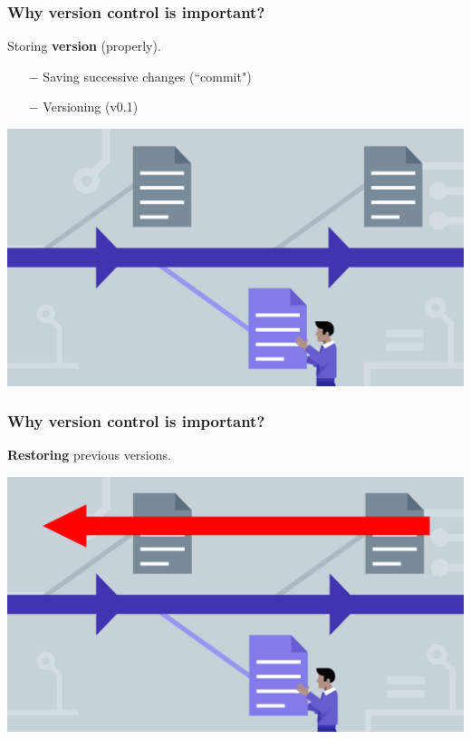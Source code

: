 \documentclass[svgnames]{beamer}
\begin{document}
\begin{frame}
\frametitle{Why version control is important?}

Storing \textbf{version} (properly). 
  \begin{itemize}
    \item [$-$] Saving successive changes (``commit")
    \item [$-$] Versioning (v0.1)
  \end{itemize}


\begin{center}
\includegraphics[scale=0.15]{img/storingVersion.jpg}
\end{center}

\end{frame}


\begin{frame}
\frametitle{Why version control is important?}
\textbf{Restoring} previous versions.

\begin{center}
\includegraphics[scale=0.20]{img/storingVersion2.png}
\end{center}  

\end{frame}
\end{document}
